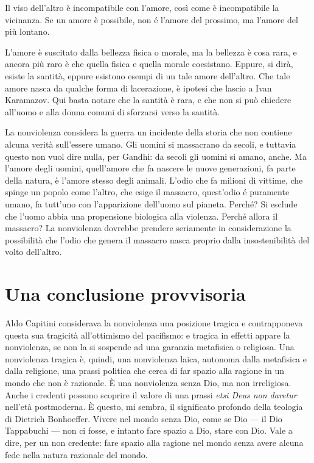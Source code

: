 \documentclass[12pt,oneside,openany]{book}
\begin{document}
Il viso dell'altro è incompatibile con l'amore, così come è incompatibile la vicinanza. Se un amore è possibile, non é l'amore del prossimo, ma l'amore del più lontano.



L'amore è suscitato dalla bellezza fisica o morale, ma la bellezza è cosa rara, e ancora più raro è che quella fisica e quella morale coesistano. Eppure, si dirà, esiste la santità, eppure esistono esempi di un tale amore dell'altro. Che tale amore nasca da qualche forma di lacerazione, è ipotesi che lascio a Ivan Karamazov. Qui basta notare che la santità è rara, e che non si può chiedere all'uomo e alla donna comuni di sforzarsi verso la santità.



La nonviolenza considera la guerra un incidente della storia che non contiene alcuna verità sull'essere umano. Gli uomini si massacrano da secoli, e tuttavia questo non vuol dire nulla, per Gandhi: da secoli gli uomini si amano, anche. Ma l'amore degli uomini, quell'amore che fa nascere le nuove generazioni, fa parte della natura, è l'amore stesso degli animali. L'odio che fa milioni di vittime, che spinge un popolo come l'altro, che esige il massacro, quest'odio é puramente umano, fa tutt'uno con l'apparizione dell'uomo sul pianeta. Perché? Si esclude che l'uomo abbia una propensione biologica alla violenza. Perché allora il massacro? La nonviolenza dovrebbe prendere seriamente in considerazione la possibilità che l'odio che genera il massacro nasca proprio dalla insostenibilità del volto dell'altro.

\chapter*{Una conclusione provvisoria}

Aldo Capitini considerava la nonviolenza una posizione tragica e contrapponeva questa sua tragicità all'ottimismo del pacifismo: e tragica in effetti appare la nonviolenza, se non la si sospende ad una garanzia metafisica o religiosa. Una nonviolenza tragica è, quindi, una nonviolenza laica, autonoma dalla metafisica e dalla religione, una prassi politica che cerca di far spazio alla ragione in un mondo che non è razionale. È una nonviolenza senza Dio, ma non irreligiosa. Anche i credenti possono scoprire il valore di una prassi \emph{etsi Deus non daretur} nell'età postmoderna. È questo, mi sembra, il significato profondo della teologia di Dietrich Bonhoeffer. Vivere nel mondo senza Dio, come se Dio --- il Dio Tappabuchi --- non ci fosse, e intanto fare spazio a Dio, stare con Dio. Vale a dire, per un non credente: fare spazio alla ragione nel mondo senza avere alcuna fede nella natura razionale del mondo.
\end{document}
